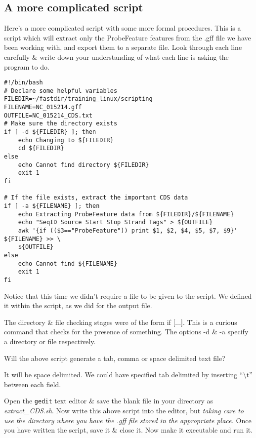 \subsection*{A more complicated script}

Here's a more complicated script with some more formal procedures.
This is a script which will extract only the ProbeFeature features from the .gff file we have been working
with, and export them to a separate file.
Look through each line carefully \& write down your understanding of what each line is asking the
program to do.

\begin{lstlisting}[style=command_syntax]
#!/bin/bash
# Declare some helpful variables
FILEDIR=~/fastdir/training_linux/scripting
FILENAME=NC_015214.gff
OUTFILE=NC_015214_CDS.txt
# Make sure the directory exists
if [ -d ${FILEDIR} ]; then
	echo Changing to ${FILEDIR}
	cd ${FILEDIR}
else
	echo Cannot find directory ${FILEDIR}
	exit 1
fi

# If the file exists, extract the important CDS data
if [ -a ${FILENAME} ]; then
	echo Extracting ProbeFeature data from ${FILEDIR}/${FILENAME}
	echo "SeqID Source Start Stop Strand Tags" > ${OUTFILE}
	awk '{if (($3=="ProbeFeature")) print $1, $2, $4, $5, $7, $9}' ${FILENAME} >> \
	${OUTFILE}
else
	echo Cannot find ${FILENAME}
	exit 1
fi

\end{lstlisting}

Notice that this time we didn't require a file to be given to the script.
We defined it within the script, as we did for the output file.

\begin{information}
The directory \& file checking stages were of the form if [...].
This is a curious command that checks for the presence of something. 
The options -d \& -a specify a directory or file respectively.
\end{information}

\begin{questions}
Will the above script generate a tab, comma or space delimited text file? \\
\begin{answer}
It will be space delimited. 
We could have specified tab delimited by inserting ``\textbackslash t'' between each field.
\end{answer}
\end{questions}

\begin{steps}
Open the \texttt{gedit} text editor \& save the blank file in your directory as
\textit{extract\_CDS.sh}.
Now write this above script into the editor, but \textit{taking care to use the directory where you
have the .gff file stored in the appropriate place.}
Once you have written the script, save it \& close it.
Now make it executable and run it.\\
\end{steps}


